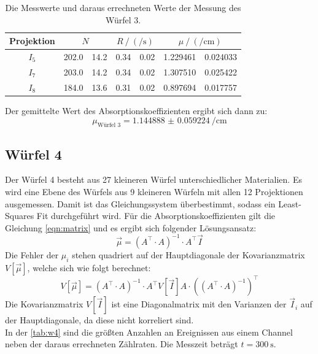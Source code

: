   \begin{table}[H]
    \centering
    \caption{Die Messwerte und daraus errechneten Werte der Messung des Würfel 3.}
    \label{tab:w3}
    \begin{tabular}{c S[table-format=3.1] @{${}\pm{}$} S[table-format=2.1] S[table-format=2.2] @{${}\pm{}$} S[table-format=1.2] S[table-format=1.6] @{${}\pm{}$} S[table-format=1.6]}
      \toprule
      {Projektion} &  &  &  \\
      \midrule
      $I_5$& 202.0 & 14.2 & 0.34 & 0.02 & 1.229461 & 0.024033 \\
      $I_7$& 203.0 & 14.2 & 0.34 & 0.02 & 1.307510 & 0.025422 \\
      $I_8$& 184.0 & 13.6 & 0.31 & 0.02 & 0.897694 & 0.017757 \\
      \bottomrule  
    \end{tabular}
  \end{table}

  \noindent Der gemittelte Wert des Absorptionskoeffizienten ergibt sich dann zu:
  \begin{equation*}
    \mu_{\text{Würfel 3}} = \SI{1.144888(59224)}{\per\centi\meter}
  \end{equation*}

\subsection{Würfel 4}

  \noindent Der Würfel 4 besteht aus 27 kleineren Würfel unterschiedlicher Materialien. Es wird eine Ebene des Würfels aus 9 kleineren Würfeln mit 
  allen 12 Projektionen ausgemessen. Damit ist das Gleichungssystem überbestimmt, sodass ein Least-Squares Fit durchgeführt wird. Für die 
  Absorptionskoeffizienten gilt die Gleichung \eqref{eqn:matrix} und es ergibt sich folgender Lösungsansatz:
  \begin{equation*}
    \vec{\mu} = \left( A^\top \cdot A \right)^{-1} \cdot A^\top \vec{I}
  \end{equation*}
  Die Fehler der $\mu_i$ stehen quadriert auf der Hauptdiagonale der Kovarianzmatrix $V[\vec{\mu}]$, welche sich wie folgt berechnet:
  \begin{equation*}
    V[\vec{\mu}] = \left( A^\top \cdot A \right)^{-1} \cdot A^\top V[\vec{I}] A \cdot \left( \left(A^\top \cdot A\right)^{-1} \right)^\top
  \end{equation*}
  Die Kovarianzmatrix $V[\vec{I}]$ ist eine Diagonalmatrix mit den Varianzen der $\vec{I}_i$ auf der Hauptdiagonale, da diese nicht korreliert sind.\\ 
  In der \autoref{tab:w4} sind die größten Anzahlen an Ereignissen aus einem Channel neben der daraus errechneten Zählraten.
  Die Messzeit beträgt $t =  \SI{300}{\second}$. 

